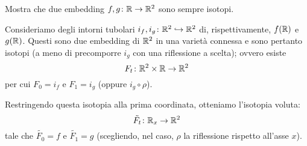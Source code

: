 \documentclass[a4paper]{article}
\begin{document}
\begin{ex}[5.2]{Mostra che due embedding $ f, g \colon \mathbb{R} \to \mathbb{R}^2 $ sono sempre isotopi.}
	
	Consideriamo degli intorni tubolari $ i_f, i_g\colon \mathbb{R}^2 \hookrightarrow \mathbb{R}^2 $ di, rispettivamente, $ f(\mathbb{R}) $ e $ g(\mathbb{R}) $. Questi sono due embedding di $ \mathbb{R}^2 $ in una varietà connessa e sono pertanto isotopi (a meno di precomporre $ i_g $ con una riflessione a scelta); ovvero esiste $$  F_t\colon \mathbb{R}^2 \times \mathbb{R} \to \mathbb{R}^2  $$ per cui $ F_0 = i_f $ e $ F_1 = i_g $ (oppure $ i_g \circ \rho $).
	
	Restringendo questa isotopia alla prima coordinata, otteniamo l'isotopia voluta: \[ \tilde{F_t}\colon \mathbb{R}_x \to \mathbb{R}^2 \]
	tale che $ \tilde{F_0} = f $ e $ \tilde{F_1} = g $ (scegliendo, nel caso, $ \rho $ la riflessione rispetto all'asse $ x $). 
	
\end{ex}

%	
%	
%	
%	
\end{document}
